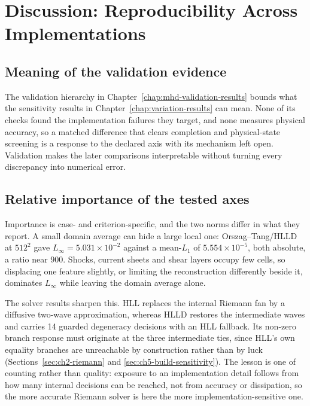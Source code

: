 
\chapter{Discussion: Reproducibility Across Implementations}
\label{chap:reproducibility-discussion}

\section{Meaning of the validation evidence}
\label{sec:ch6-validation-meaning}

The validation hierarchy in Chapter~\ref{chap:mhd-validation-results} bounds
what the sensitivity results in Chapter~\ref{chap:variation-results} can mean.
None of its checks found the implementation failures they target, and none
measures physical accuracy, so a matched difference that clears completion and
physical-state screening is a response to the declared axis with its mechanism
left open. Validation makes the later comparisons interpretable without turning
every discrepancy into numerical error.

\section{Relative importance of the tested axes}
\label{sec:ch6-relative-importance}

Importance is case- and criterion-specific, and the two norms differ in what
they report. A small domain average can hide a large local one:
Orszag--Tang/HLLD at $512^2$ gave $L_\infty=5.031\times10^{-2}$ against a
mean-$L_1$ of $5.554\times10^{-5}$, both absolute, a ratio near $900$.
Shocks, current sheets and shear layers occupy few cells, so displacing one
feature slightly, or limiting the reconstruction differently beside it,
dominates $L_\infty$ while leaving the domain average alone.

The solver results sharpen this. HLL replaces the internal Riemann fan by a
diffusive two-wave approximation, whereas HLLD restores the intermediate waves
\citep{miyoshiKusano2005hlld} and carries 14 guarded degeneracy decisions with
an HLL fallback. Its non-zero branch response must originate at the three
intermediate ties, since HLL's own equality branches are unreachable by
construction rather than by luck
(Sections~\ref{sec:ch2-riemann} and \ref{sec:ch5-build-sensitivity}). The
lesson is one of counting rather than quality: exposure to an implementation
detail follows from how many internal decisions can be reached, not from
accuracy or dissipation, so the more accurate Riemann solver is here the more
implementation-sensitive one.

